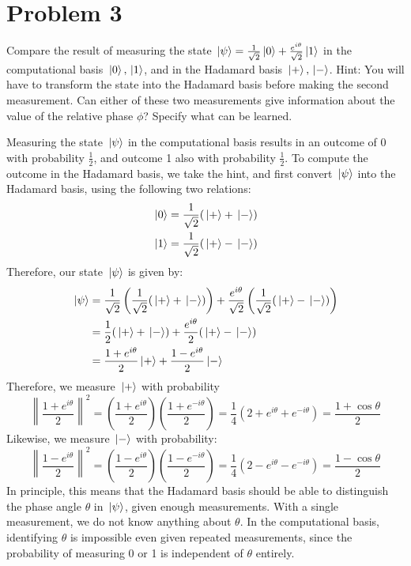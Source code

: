 \documentclass[10pt]{article}
\begin{document}
	\pagebreak
	\section*{Problem 3}
	Compare the result of measuring the state \( \ket*{\psi} = \frac{1}{\sqrt{2} }\ket*{0} +
	\frac{e^{i \theta}}{\sqrt{2} }\ket*{1} \) in the computational basis \( \ket*{0}, \ket*{1} \), 
	and in the Hadamard basis \( \ket*{+}, \ket*{-} \). Hint: You will have to transform the state into the Hadamard
	basis before making the second measurement. Can either of these two measurements give information about the value of
	the relative phase \( \phi \)? Specify what can be learned. 

	\begin{solution}
		Measuring the state \( \ket*{\psi} \) in the computational basis results in an outcome of 0 with probability
		\( \frac{1}{2} \), and outcome 1 also with probability \( \frac{1}{2} \). To compute the outcome in the 
		Hadamard basis, we take the hint, and first convert \( \ket*{\psi} \) into the Hadamard basis, using 
		the following two relations:
		\begin{align*}
			\ket*{0} &= \frac{1}{\sqrt{2} }(\ket*{+} + \ket*{-})\\
			\ket*{1} &= \frac{1}{\sqrt{2} }(\ket*{+} - \ket*{-}) \\
		\end{align*}
		Therefore, our state \( \ket*{\psi} \) is given by:
		\begin{align*}
			\ket*{\psi} &= \frac{1}{\sqrt{2} }\left(\frac{1}{\sqrt{2} }(\ket*{+} + \ket*{-})\right)
		+ \frac{e^{i \theta}}{\sqrt{2} }\left( \frac{1}{\sqrt{2} }(\ket*{+} - \ket*{-}) \right) \\
		&= \frac{1}{2}(\ket*{+} + \ket*{-}) + \frac{e^{i \theta}}{2}(\ket*{+} - \ket*{-}) \\
		&= \frac{1 + e^{i \theta}}{2}\ket*{+} + \frac{1 - e^{i \theta}}{2}\ket*{-} 
		\end{align*}
		Therefore, we measure \( \ket*{+} \) with probability 
		\[
		\left\|\frac{1 + e^{i \theta}}{2}\right\|^2 = \left( \frac{1 + e^{ i \theta}}{2} \right) 
		\left( \frac{1 + e^{-i \theta}}{2} \right) = \frac{1}{4}(2 + e^{i \theta} + e^{-i \theta})
		= \frac{1 + \cos \theta}{2}
		\] 
		Likewise, we measure \( \ket*{-} \) with probability:
		\[
			\left\| \frac{1 - e^{i \theta}}{2}\right\|^2 = \left( \frac{1 - e^{i \theta}}{2} \right) 
		\left( \frac{1 - e^{-i \theta}}{2} \right) = \frac{1}{4}(2 - e^{i \theta} - e^{-i \theta})
		= \frac{1 - \cos \theta}{2}
		\]	
		In principle, this means that the Hadamard basis should be able to distinguish the phase angle 
		\( \theta \) in \( \ket*{\psi} \), given enough measurements. With a single measurement, 
		we do not know anything about \( \theta \). In the computational basis, identifying \( \theta \) is 
		impossible even given repeated measurements, since the probability of measuring 0 or 1 is independent 
		of \( \theta \) entirely.
	\end{solution}
	\pagebreak
\end{document}
